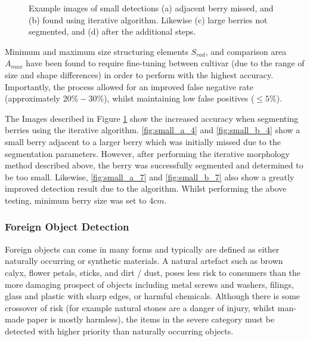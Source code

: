 \documentclass[fleqn,twoside,12pt]{report}
\begin{document}
\begin{figure}[h]
	\caption{Example images of small detections (a) adjacent berry missed, and (b) found using iterative algorithm. Likewise (c) large berries not segmented, and (d) after the additional steps.}
	\label{fig:small_process}
\end{figure}

Minimum and maximum size structuring elements $S_{rad}$, and comparison area $A_{max}$ have been found to require fine-tuning between cultivar (due to the range of size and shape differences) in order to perform with the highest accuracy. Importantly, the process allowed for an improved false negative rate (approximately $20\%-30\%$), whilst maintaining low false positives ($\leq5\%$). 


The Images described in Figure \ref{fig:small_process} show the increased accuracy when segmenting berries using the iterative algorithm. \ref{fig:small_a_4} and \ref{fig:small_b_4} show a small berry adjacent to a larger berry which was initially missed due to the segmentation parameters. However, after performing the iterative morphology method described above, the berry was successfully segmented and determined to be too small. Likewise, \ref{fig:small_a_7} and \ref{fig:small_b_7} also show a greatly improved detection result due to the algorithm. Whilst performing the above testing, minimum berry size was set to $4cm$.




\subsubsection{Foreign Object Detection}


Foreign objects can come in many forms and typically are defined as either naturally occurring or synthetic materials. A natural artefact such as brown calyx, flower petals, sticks, and dirt / dust, poses less risk to consumers than the more damaging prospect of objects including metal screws and washers, filings, glass and plastic with sharp edges, or harmful chemicals. Although there is some crossover of risk (for example natural stones are a danger of injury, whilst man-made paper is mostly harmless), the items in the severe category must be detected with higher priority than naturally occurring objects. 
\end{document}
